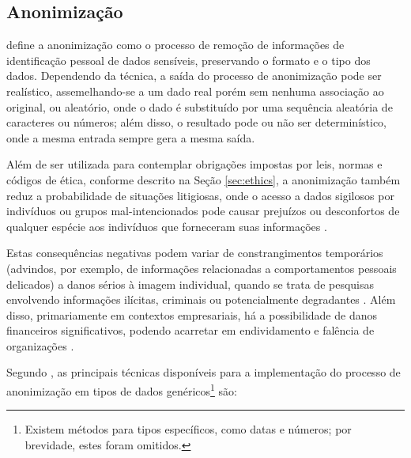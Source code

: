 \subsection{Anonimização} \label{sec:anonymization}

 define a anonimização como o processo de remoção de informações de identificação pessoal de dados sensíveis, preservando o formato e o tipo dos dados. Dependendo da técnica, a saída do processo de anonimização pode ser realístico, assemelhando-se a um dado real porém sem nenhuma associação ao original, ou aleatório, onde o dado é substituído por uma sequência aleatória de caracteres ou números; além disso, o resultado pode ou não ser determinístico, onde a mesma entrada sempre gera a mesma saída.

Além de ser utilizada para contemplar obrigações impostas por leis, normas e códigos de ética, conforme descrito na Seção \ref{sec:ethics}, a anonimização também reduz a probabilidade de situações litigiosas, onde o acesso a dados sigilosos por indivíduos ou grupos mal-intencionados pode causar prejuízos ou desconfortos de qualquer espécie aos indivíduos que forneceram suas informações \cite{Raghunathan2013}.

Estas consequências negativas podem variar de constrangimentos temporários (advindos, por exemplo, de informações relacionadas a comportamentos pessoais delicados) a danos sérios à imagem individual, quando se trata de pesquisas envolvendo informações ilícitas, criminais ou potencialmente degradantes \cite{DeLeeuw2008}. Além disso, primariamente em contextos empresariais, há a possibilidade de danos financeiros significativos, podendo acarretar em endividamento e falência de organizações \cite{Raghunathan2013}.

Segundo , as principais técnicas disponíveis para a implementação do processo de anonimização em tipos de dados genéricos\footnote{Existem métodos para tipos específicos, como datas e números; por brevidade, estes foram omitidos.} são:

